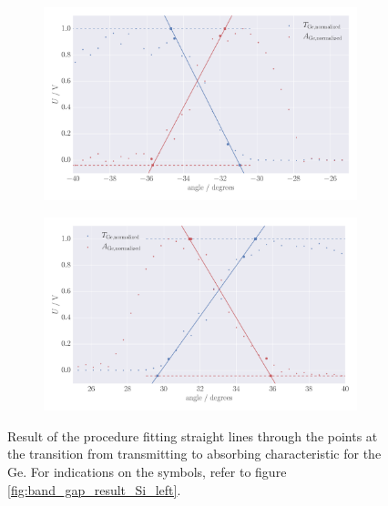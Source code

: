 \begin{figure}
    \centering
    \begin{subfigure}[b]{\pltw}
        \includegraphics[width=1.0\linewidth]{figures/band_gap_result_Ge_left}
        \caption{}
        \label{fig:band_gap_result_Ge_left}
    \end{subfigure}
    \begin{subfigure}[b]{\pltw}
        \includegraphics[width=1.0\linewidth]{figures/band_gap_result_Ge_right}
        \caption{}
        \label{fig:band_gap_result_Ge_right}
    \end{subfigure}
    \caption{
        Result of the procedure fitting straight lines through the points 
        at the transition from transmitting to absorbing characteristic
        for the Ge.
        For indications on the symbols, refer to figure 
        \ref{fig:band_gap_result_Si_left}. 
        }
    \label{fig:band_gap_result_Ge}
\end{figure}

